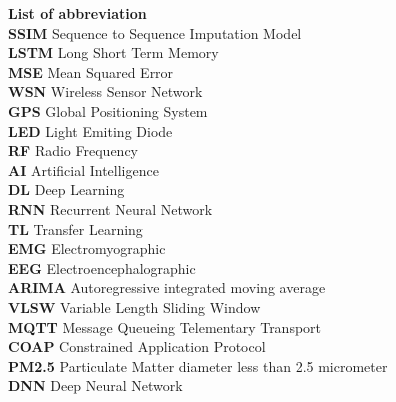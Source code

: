 \thispagestyle{plain}
\begin{titlepage}
\huge
\textbf{List of abbreviation}\\

\normalsize
\noindent
\textbf{SSIM} \hfill Sequence to Sequence Imputation Model \\
\textbf{LSTM} \hfill Long Short Term Memory \\
\textbf{MSE} \hfill Mean Squared Error \\
\textbf{WSN} \hfill Wireless Sensor Network \\
\textbf{GPS} \hfill Global Positioning System \\
\textbf{LED} \hfill Light Emiting Diode \\
\textbf{RF} \hfill Radio Frequency \\
\textbf{AI} \hfill Artificial Intelligence \\
\textbf{DL} \hfill Deep Learning \\
\textbf{RNN} \hfill Recurrent Neural Network\\
\textbf{TL} \hfill Transfer Learning\\
\textbf{EMG} \hfill Electromyographic\\
\textbf{EEG} \hfill Electroencephalographic\\
\textbf{ARIMA} \hfill Autoregressive integrated moving average\\
\textbf{VLSW} \hfill Variable Length Sliding Window\\
\textbf{MQTT} \hfill Message Queueing Telementary Transport\\
\textbf{COAP} \hfill Constrained Application Protocol\\
\textbf{PM2.5} \hfill Particulate Matter diameter less than 2.5 micrometer \\
\textbf{DNN} \hfill Deep Neural Network\\

\end{titlepage}